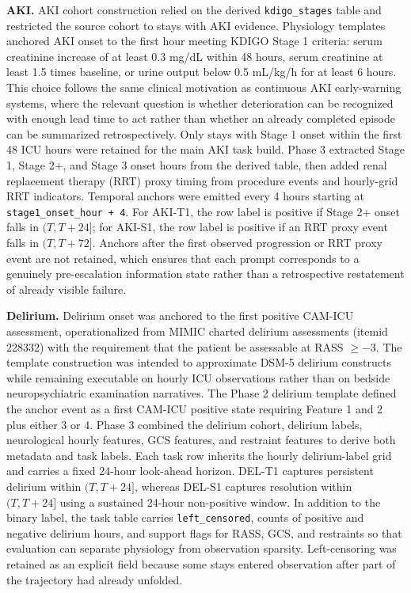 \documentclass[pdflatex,sn-nature]{sn-jnl}
\begin{document}
\noindent\textbf{AKI.} AKI cohort construction relied on the derived \texttt{kdigo\_stages} table and restricted the source cohort to stays with AKI evidence. Physiology templates anchored AKI onset to the first hour meeting KDIGO Stage 1 criteria: serum creatinine increase of at least 0.3 mg/dL within 48 hours, serum creatinine at least 1.5 times baseline, or urine output below 0.5 mL/kg/h for at least 6 hours\cite{kdigo2012aki}. This choice follows the same clinical motivation as continuous AKI early-warning systems, where the relevant question is whether deterioration can be recognized with enough lead time to act rather than whether an already completed episode can be summarized retrospectively\cite{tomasev2019aki}. Only stays with Stage 1 onset within the first 48 ICU hours were retained for the main AKI task build. Phase 3 extracted Stage 1, Stage 2+, and Stage 3 onset hours from the derived table, then added renal replacement therapy (RRT) proxy timing from procedure events and hourly-grid RRT indicators. Temporal anchors were emitted every 4 hours starting at \texttt{stage1\_onset\_hour + 4}. For AKI-T1, the row label is positive if Stage 2+ onset falls in $(T, T+24]$; for AKI-S1, the row label is positive if an RRT proxy event falls in $(T, T+72]$. Anchors after the first observed progression or RRT proxy event are not retained, which ensures that each prompt corresponds to a genuinely pre-escalation information state rather than a retrospective restatement of already visible failure.

\noindent\textbf{Delirium.} Delirium onset was anchored to the first positive CAM-ICU assessment, operationalized from MIMIC charted delirium assessments (itemid 228332) with the requirement that the patient be assessable at RASS $\geq -3$\cite{ely2001camicu}. The template construction was intended to approximate DSM-5 delirium constructs while remaining executable on hourly ICU observations rather than on bedside neuropsychiatric examination narratives\cite{apa2013dsm5}. The Phase 2 delirium template defined the anchor event as a first CAM-ICU positive state requiring Feature 1 and 2 plus either 3 or 4. Phase 3 combined the delirium cohort, delirium labels, neurological hourly features, GCS features, and restraint features to derive both metadata and task labels. Each task row inherits the hourly delirium-label grid and carries a fixed 24-hour look-ahead horizon. DEL-T1 captures persistent delirium within $(T, T+24]$, whereas DEL-S1 captures resolution within $(T, T+24]$ using a sustained 24-hour non-positive window. In addition to the binary label, the task table carries \texttt{left\_censored}, counts of positive and negative delirium hours, and support flags for RASS, GCS, and restraints so that evaluation can separate physiology from observation sparsity. Left-censoring was retained as an explicit field because some stays entered observation after part of the trajectory had already unfolded.
\end{document}
